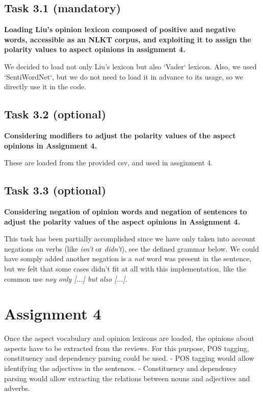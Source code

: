 \documentclass[11pt]{article}
\begin{document}
\hypertarget{task-3.1-mandatory}{%
    \subsection{Task 3.1 (mandatory)}\label{task-3.1-mandatory}}

\textbf{Loading Liu's opinion lexicon composed of positive and negative
    words, accessible as an NLKT corpus, and exploiting it to assign the
    polarity values to aspect opinions in assignment 4.}

We decided to load not only Liu's lexicon but also `Vader` lexicon. Also, we used `SentiWordNet`, but we do not need to load it in advance to its usage, so we directly use it in the code.


\hypertarget{task-3.2-optional}{%
    \subsection{Task 3.2 (optional)}\label{task-3.2-optional}}

\textbf{Considering modifiers to adjust the polarity values of the
    aspect opinions in Assignment 4.}
    
These are loaded from the provided csv, and used in assginment 4.

\hypertarget{task-3.3-optional}{%
    \subsection{Task 3.3 (optional)}\label{task-3.3-optional}}

\textbf{Considering negation of opinion words and negation of sentences to adjust the polarity values of the aspect opinions in Assignment 4.}
    
This task has been partially accomplished since we have only taken into account negations on verbs (like \emph{isn't} or \emph{didn't}), see the defined grammar below. We could have somply added another negation is a \emph{not} word was present in the sentence, but we felt that some cases didn't fit at all with this implementation, like the common use \emph{noy only [...] but also [...]}.

\hypertarget{assignment-4}{%
    \section{Assignment 4}\label{assignment-4}}

Once the aspect vocabulary and opinion lexicons are loaded, the opinions
about aspects have to be extracted from the reviews. For this purpose,
POS tagging, constituency and dependency parsing could be used. - POS
tagging would allow identifying the adjectives in the sentences. -
Constituency and dependency parsing would allow extracting the relations
between nouns and adjectives and adverbs.
\end{document}
